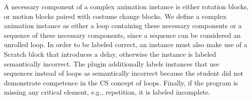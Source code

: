 A necessary component of a complex animation instance is either rotation
blocks, or motion blocks paired with costume change blocks. We define a complex
animation instance as either a loop containing these necessary components or a
sequence of these necessary components, since a sequence can be considered an
unrolled loop. In order to be labeled correct, an instance must also make use
of a Scratch block that introduces a delay, otherwise the instance is labeled
semantically incorrect. The plugin additionally labels instances that use
sequences instead of loops as semantically incorrect because the student did
not demonstrate competence in the CS concept of loops. Finally, if the program
is missing any critical element, e.g., repetition, it is labeled incomplete.
